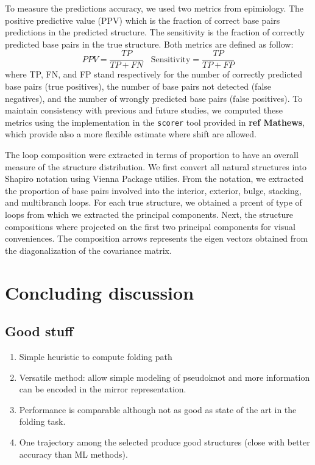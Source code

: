 \documentclass[a4paper,12pt]{article}
\begin{document}
{{To measure the predictions accuracy, we used two metrics from epimiology. The
positive predictive value (PPV) which is the fraction of correct base pairs
predictions in the predicted structure. The sensitivity is the fraction of
correctly predicted base pairs in the true structure. Both metrics are defined
as follow:
\begin{equation}
PPV = \frac{TP}{TP + FN} \;\;\; \text{Sensitivity} = \frac{TP}{TP+FP}
\end{equation}
where TP, FN, and FP stand respectively for the number of correctly predicted
base pairs (true positives), the number of base pairs not detected (false
negatives), and the number of wrongly predicted base pairs (false positives). To
maintain consistency with previous and future studies, we computed these metrics
using the implementation in the \texttt{scorer} tool provided in \textbf{ref Mathews}, which
provide also a more flexible estimate where shift are allowed.

The loop composition were extracted in terms of proportion to have an overall
measure of the structure distribution. We first convert all natural structures
into Shapiro notation using Vienna Package utilies. From the notation, we
extracted the proportion of base pairs involved into the interior, exterior,
bulge, stacking, and multibranch loops. For each true structure, we obtained a
prcent of type of loops from which we extracted the principal components. Next,
the structure compositions where projected on the first two principal components
for visual conveniences. The composition arrows represents the eigen vectors
obtained from the diagonalization of the covariance matrix.

\clearpage
\section{Concluding discussion}
\label{sec:org66df435}
\subsection{Good stuff}
\label{sec:org31cbbc4}
\begin{enumerate}
\item Simple heuristic to compute folding path
\item Versatile method: allow simple modeling of pseudoknot and more information
can be encoded in the mirror representation.
\item Performance is comparable although not as good as state of the art in the
folding task.
\item One trajectory among the selected produce good structures (close with better
accuracy than ML methods).
\end{enumerate}

}}
\end{document}
